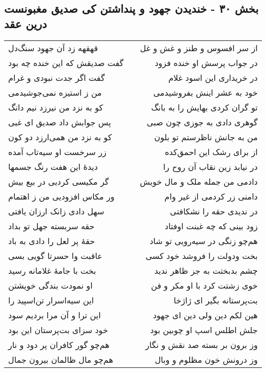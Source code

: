 \begin{center}
\section*{بخش ۳۰ - خندیدن جهود و پنداشتن کی صدیق مغبونست درین عقد}
\label{sec:sh030}
\begin{longtable}{l p{0.5cm} r}
قهقهه زد آن جهود سنگ‌دل
&&
از سر افسوس و طنز و غش و غل
\\
گفت صدیقش که این خنده چه بود
&&
در جواب پرسش او خنده فزود
\\
گفت اگر جدت نبودی و غرام
&&
در خریداری این اسود غلام
\\
من ز استیزه نمی‌جوشیدمی
&&
خود به عشر اینش بفروشیدمی
\\
کو به نزد من نیرزد نیم دانگ
&&
تو گران کردی بهایش را به بانگ
\\
پس جوابش داد صدیق ای غبی
&&
گوهری دادی به جوزی چون صبی
\\
کو به نزد من همی‌ارزد دو کون
&&
من به جانش ناظرستم تو بلون
\\
زر سرخست او سیه‌تاب آمده
&&
از برای رشک این احمق‌کده
\\
دیدهٔ این هفت رنگ جسمها
&&
در نیابد زین نقاب آن روح را
\\
گر مکیسی کردیی در بیع بیش
&&
دادمی من جمله ملک و مال خویش
\\
ور مکاس افزودیی من ز اهتمام
&&
دامنی زر کردمی از غیر وام
\\
سهل دادی زانک ارزان یافتی
&&
در ندیدی حقه را نشکافتی
\\
حقه سربسته جهل تو بداد
&&
زود بینی که چه غبنت اوفتاد
\\
حقهٔ پر لعل را دادی به باد
&&
هم‌چو زنگی در سیه‌رویی تو شاد
\\
عاقبت وا حسرتا گویی بسی
&&
بخت ودولت را فروشد خود کسی
\\
بخت با جامهٔ غلامانه رسید
&&
چشم بدبختت به جز ظاهر ندید
\\
او نمودت بندگی خویشتن
&&
خوی زشتت کرد با او مکر و فن
\\
این سیه‌اسرار تن‌اسپید را
&&
بت‌پرستانه بگیر ای ژاژخا
\\
این ترا و آن مرا بردیم سود
&&
هین لکم دین ولی دین ای جهود
\\
خود سزای بت‌پرستان این بود
&&
جلش اطلس اسپ او چوبین بود
\\
هم‌چو گور کافران پر دود و نار
&&
وز برون بر بسته صد نقش و نگار
\\
هم‌چو مال ظالمان بیرون جمال
&&
وز درونش خون مظلوم و وبال
\\

\end{longtable}
\end{center}
